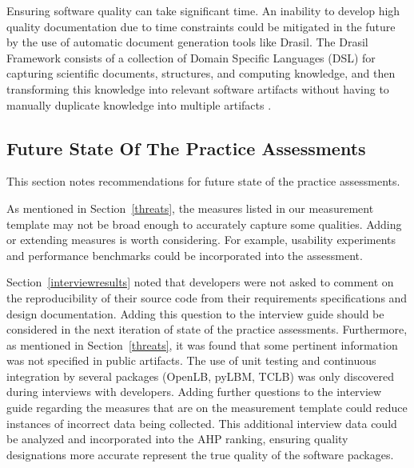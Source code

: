 \documentclass[final, 3p, times, authoryear]{elsarticle}
\begin{document}
Ensuring software quality can take significant time. An inability to develop
high quality documentation due to time constraints could be mitigated in the
future by the use of automatic document generation tools like Drasil. The Drasil
Framework consists of a collection of Domain Specific Languages (DSL) for
capturing scientific documents, structures, and computing knowledge, and then
transforming this knowledge into relevant software artifacts without having to
manually duplicate knowledge into multiple artifacts \citep{zhao2018}.

\subsection{Future State Of The Practice Assessments} \label{futuresop}

This section notes recommendations for future state of the practice assessments.

As mentioned in Section~\ref{threats}, the measures listed in our measurement
template may not be broad enough to accurately capture some qualities. Adding or
extending measures is worth considering. For example, usability experiments and
performance benchmarks could be incorporated into the assessment.

Section~\ref{interviewresults} noted that developers were not asked to comment
on the reproducibility of their source code from their requirements
specifications and design documentation. Adding this question to the interview
guide should be considered in the next iteration of state of the practice
assessments. Furthermore, as mentioned in Section~\ref{threats}, it was found
that some pertinent information was not specified in public artifacts. The use
of unit testing and continuous integration by several packages (OpenLB, pyLBM,
TCLB) was only discovered during interviews with developers. Adding further
questions to the interview guide regarding the measures that are on the
measurement template could reduce instances of incorrect data being collected.
This additional interview data could be analyzed and incorporated into the AHP
ranking, ensuring quality designations more accurate represent the true quality
of the software packages.



\end{document}
